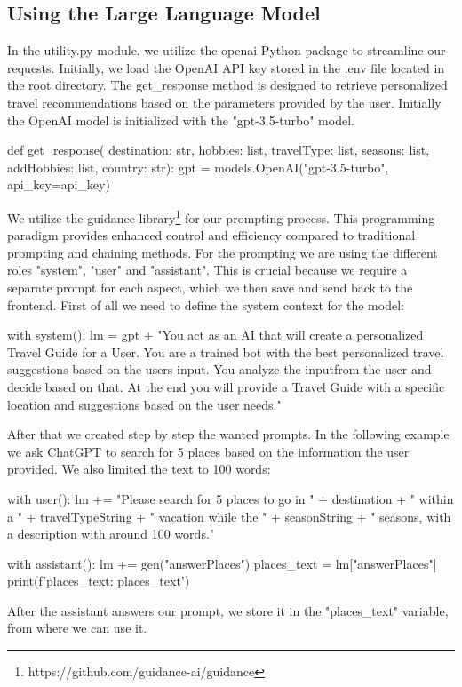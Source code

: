 \documentclass[english,notitlepage,smartquotes]{hgbreport}
\begin{document}
\subsection{Using the Large Language Model}
In the utility.py module, we utilize the openai Python package to streamline our requests. Initially, we load the OpenAI API key stored in the .env file located in the root directory. The get\_response method is designed to retrieve personalized travel recommendations based on the parameters provided by the user. Initially the OpenAI model is initialized with the "gpt-3.5-turbo" model.
\begin{PythonCode}
	def get_response(
	destination: str, hobbies: list, travelType: list, seasons: list, addHobbies: list, country: str):
	gpt = models.OpenAI("gpt-3.5-turbo", api_key=api_key)
\end{PythonCode}
We utilize the guidance library\footnote{https://github.com/guidance-ai/guidance} for our prompting process. This programming paradigm provides enhanced control and efficiency compared to traditional prompting and chaining methods. For the prompting we are using the different roles "system", "user" and "assistant". This is crucial because we require a separate prompt for each aspect, which we then save and send back to the frontend. First of all we need to define the system context for the model: 
\begin{PythonCode}
	with system():
	lm = gpt + "You act as an AI that will create a personalized Travel Guide for a User. You are a trained bot with the best personalized travel suggestions based on the users input. You analyze the inputfrom the user and decide based on that. At the end you will provide a Travel Guide with a specific location and suggestions based on the user needs."
\end{PythonCode}
After that we created step by step the wanted prompts. In the following example we ask ChatGPT to search for 5 places based on the information the user provided. We also limited the text to 100 words:
\begin{PythonCode}
	with user():
	lm += "Please search for 5 places to go in " + destination + " within a " + travelTypeString + " vacation while the " + seasonString + " seasons, with a description with around 100 words."
	
	with assistant():
	lm += gen("answerPlaces")
	places_text = lm["answerPlaces"]
	print(f'places_text: {places_text}')
\end{PythonCode}
After the assistant answers our prompt, we store it in the "places\_text" variable, from where we can use it.
\end{document}

